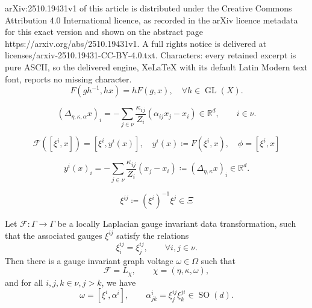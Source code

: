 \documentclass[10pt,a4paper]{amsart}
\DeclareMathOperator{\GL}{GL}
\DeclareMathOperator{\SO}{SO}
\newcommand{\R}{\mathbb{R}}
\newcommand{\mc}[1]{\mathcal{#1}}
\providecommand\Lpl; %
\renewcommand{\Lpl}{\Delta}
\providecommand\X; %
\renewcommand{\X}{X}
\providecommand\a; %
\renewcommand{\a}{\alpha}
\providecommand\x; %
\renewcommand{\x}{x}
\begin{document}
arXiv:2510.19431v1 of this article is distributed under the Creative Commons Attribution 4.0 International licence, as recorded in the arXiv licence metadata for this exact version and shown on the abstract page https://arxiv.org/abs/2510.19431v1. A full rights notice is delivered at licenses/arxiv-2510.19431-CC-BY-4.0.txt. Characters: every retained excerpt is pure ASCII, so the delivered engine, XeLaTeX with its default Latin Modern text font, reports no missing character.
		\begin{equation}\label{eq:consis}
			F(gh^{-1},hx) = h F(g,\x ), \quad \forall h \in \GL(\X).
		\end{equation}

			\begin{equation}\label{eq:def-lalpha}
				(\Lpl_{\eta,\kappa,\alpha}x)_i = -\sum_{j \in \nu} \frac{\kappa_{ij}}{Z_i}(\a_{ij} \x_j - \x_i) \in \R^d, \qquad i \in \nu.
			\end{equation}

	\begin{equation}\label{eq:def-yi}
		\mc{F}([\xi^{i},x]) = [\xi^{i},y^{i}(x)], \quad y^{i}(x) \coloneq F(\xi^{i},x), \quad \phi = [\xi^{i},x]
	\end{equation}

	\begin{equation}\label{eq:def-y-diag}
		y^{i}(x)_{i} = -\sum_{j \in \nu} \frac{\kappa_{ij}}{Z_{i}}(x_{j} - x_{i}) \coloneq (\Delta_{\eta,\kappa} x)_{i} \in \R^{d}.
	\end{equation}

	\begin{equation}\label{eq:ass-g}
		\xi^{ij} \coloneq (\xi^{i})^{-1} \xi^{j} \in \Xi
	\end{equation}

	\begin{proposition}\label{prop:loc-lpl}
		Let $\mc{F} : \Gamma \to \Gamma$ be a locally Laplacian gauge invariant data transformation, such that the associated gauges $\xi^{ij}$ satisfy the relations
		\begin{equation}\label{eq:intergrability}
			\xi^{ij}_{i} = \xi^{ij}_{j}, \qquad \forall i,j \in \nu.
		\end{equation}
		Then there is a gauge invariant graph voltage $\omega \in \Omega$ such that
		\begin{equation}\label{eq:mcF=Lchi}
			\mc{F} = L_{\chi}, \qquad \chi = (\eta,\kappa,\omega),
		\end{equation}
		and for all $i,j,k \in \nu, j > k$, we have
		\begin{equation}\label{eq:def-alphai}
			\omega = [\xi^{i},\alpha^{i}], \qquad
			\alpha^{i}_{jk} = \xi^{ij}_{j} \xi^{ji}_{k} \in \SO(d).
		\end{equation}
	\end{proposition}
\end{document}
